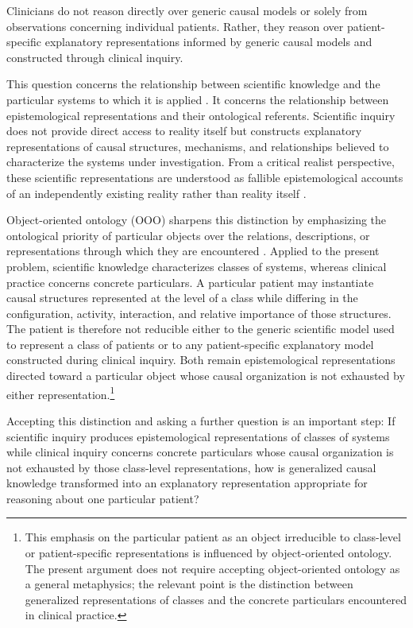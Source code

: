 \documentclass[11pt]{article}
\begin{document}
Clinicians do not reason directly over generic causal models or solely from observations concerning individual patients. Rather, they reason over patient-specific explanatory representations informed by generic causal models and constructed through clinical inquiry.

This question concerns the relationship between scientific knowledge and the particular systems to which it is applied \parencite{collins_synthesis_2018}. It concerns the relationship between epistemological representations and their ontological referents. Scientific inquiry does not provide direct access to reality itself but constructs explanatory representations of causal structures, mechanisms, and relationships believed to characterize the systems under investigation. From a critical realist perspective, these scientific representations are understood as fallible epistemological accounts of an independently existing reality rather than reality itself \parencite{bhaskar_realist_1978}.

Object-oriented ontology (OOO) sharpens this distinction by emphasizing the ontological priority of particular objects over the relations, descriptions, or representations through which they are encountered \parencite{harman_object-oriented_2018}. Applied to the present problem, scientific knowledge characterizes classes of systems, whereas clinical practice concerns concrete particulars. A particular patient may instantiate causal structures represented at the level of a class while differing in the configuration, activity, interaction, and relative importance of those structures. The patient is therefore not reducible either to the generic scientific model used to represent a class of patients or to any patient-specific explanatory model constructed during clinical inquiry. Both remain epistemological representations directed toward a particular object whose causal organization is not exhausted by either representation.\footnote{This emphasis on the particular patient as an object irreducible to class-level or patient-specific representations is influenced by object-oriented ontology. The present argument does not require accepting object-oriented ontology as a general metaphysics; the relevant point is the distinction between generalized representations of classes and the concrete particulars encountered in clinical practice.}

Accepting this distinction and asking a further question is an important step: If scientific inquiry produces epistemological representations of classes of systems while clinical inquiry concerns concrete particulars whose causal organization is not exhausted by those class-level representations, how is generalized causal knowledge transformed into an explanatory representation appropriate for reasoning about one particular patient?
\end{document}
